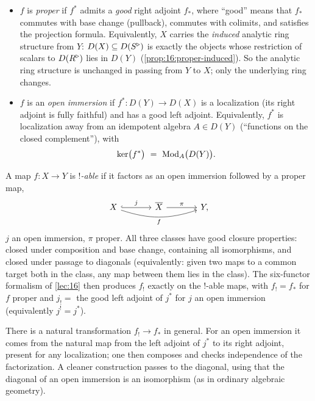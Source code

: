 \begin{definition}
\label{def:18:proper-open}
\leavevmode
\begin{itemize}
\item $f$ is \emph{proper} if $f^*$ admits a \emph{good} right adjoint
$f_*$, where ``good'' means that $f_*$ commutes with base change (pullback),
commutes with colimits, and satisfies the projection formula. Equivalently, $X$
carries the \emph{induced} analytic ring structure from $Y$: $D(X)\subseteq D(S^{\triangleright})$ is
exactly the objects whose restriction of scalars to $D(R^{\triangleright})$ lies in $D(Y)$
(\cref{prop:16:proper-induced}). So the analytic ring structure is unchanged in
passing from $Y$ to $X$; only the underlying ring changes.
\item $f$ is an \emph{open immersion} if $f^*\colon D(Y)\to D(X)$ is a
localization (its right adjoint is fully faithful) and has a good left adjoint.
Equivalently, $f^*$ is localization away from an idempotent algebra $A\in D(Y)$
(``functions on the closed complement''), with
\begin{equation*}
\ker\bigl(f^*\bigr)\ =\ \Mod_A\bigl(D(Y)\bigr).
\end{equation*}
\end{itemize}
\end{definition}

\begin{definition}
\label{def:18:shriekable}
A map $f\colon X\to Y$ is \emph{$!$-able} if it factors as an open immersion
followed by a proper map,
\begin{equation*}
\begin{tikzcd}[column sep=large]
X \arrow[r, "j", hook] \arrow[rr, bend right=18, "f"'] & \overline X \arrow[r, "\pi"] & Y,
\end{tikzcd}
\end{equation*}
$j$ an open immersion, $\pi$ proper. All three classes have good closure
properties: closed under composition and base change, containing all
isomorphisms, and closed under passage to diagonals (equivalently: given two
maps to a common target both in the class, any map between them lies in the
class). The six-functor formalism of \cref{lec:16} then produces $f_!$ exactly on
the $!$-able maps, with $f_!=f_*$ for $f$ proper and $j_!=$ the good left adjoint
of $j^*$ for $j$ an open immersion (equivalently $j^!=j^*$).
\end{definition}

\begin{remark}
\label{rmk:18:shriek-to-star}
There is a natural transformation $f_!\to f_*$ in general. For an open immersion it
comes from the natural map from the left adjoint of $j^*$ to its right adjoint,
present for any localization; one then composes and checks independence of the
factorization. A cleaner construction passes to the diagonal, using that the
diagonal of an open immersion is an isomorphism (as in ordinary algebraic
geometry).
\end{remark}

